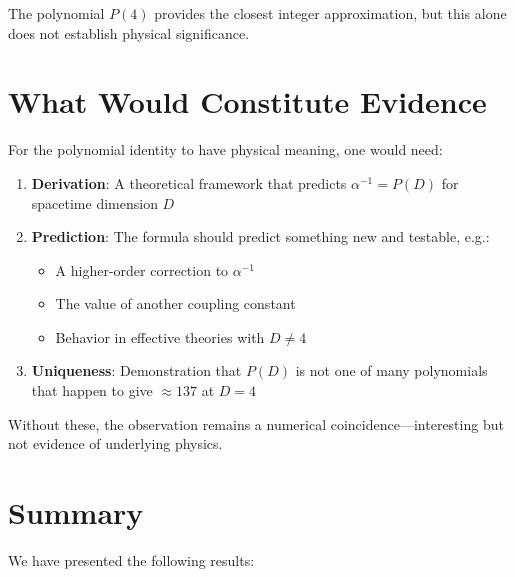 \documentclass[11pt,a4paper]{article}
\begin{document}
The polynomial $P(4)$ provides the closest integer approximation, but this alone does not establish physical significance.

\section{What Would Constitute Evidence}

For the polynomial identity to have physical meaning, one would need:

\begin{enumerate}
    \item \textbf{Derivation}: A theoretical framework that predicts $\alpha^{-1} = P(D)$ for spacetime dimension $D$
    
    \item \textbf{Prediction}: The formula should predict something new and testable, e.g.:
    \begin{itemize}
        \item A higher-order correction to $\alpha^{-1}$
        \item The value of another coupling constant
        \item Behavior in effective theories with $D \neq 4$
    \end{itemize}
    
    \item \textbf{Uniqueness}: Demonstration that $P(D)$ is not one of many polynomials that happen to give $\approx 137$ at $D=4$
\end{enumerate}

Without these, the observation remains a numerical coincidence---interesting but not evidence of underlying physics.

\section{Summary}

We have presented the following results:
\end{document}
